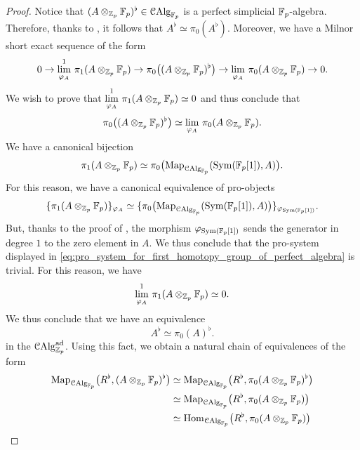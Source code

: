 \documentclass[10pt,a4paper]{amsart}
\numberwithin{equation}{subsection}
\theoremstyle{definition}
\def\lim{\mathrm{lim}}
\begin{document}
\begin{proof}
    Notice that $(A \otimes_{\mathbb Z_p} \mathbb F_p)^\flat \in \mathcal{C}\mathrm{Alg}_{\mathbb F_p}$ is a perfect simplicial $\mathbb F_p$-algebra. Therefore, thanks to \cite[Lemma 11.6]{bhatt2017projectivity}, it follows that $A^\flat \simeq \pi_0(A^\flat)$. Moreover,
    we have a Milnor short exact sequence of the form
        \[
            0 \to \underset{\varphi_{A}}{\overset{1}{\lim}} \ \pi_1(A \otimes_{\bZp} \bF_p) \to \pi_0 \big((A \otimes_{\bZp} \bF_p)^\flat \big) \to \underset{\varphi_A}{\lim} \ \pi_0(A \otimes_{\bZp} \bF_p) \to 0.
        \]
    We wish to prove that $\underset{\varphi_A}{\overset{1}{\lim}} \ \pi_1(A \otimes_{\bZp} \bF_p) \simeq 0 $ and thus conclude that
        \[
            \pi_0 \big( (A \otimes_{\bZp} \bF_p)^\flat \big) \simeq \underset{\varphi_A}{\lim} \ \pi_0(A \otimes_{\bZp} \bF_p) . 
        \]
    We have a canonical bijection
        \[
            \pi_1(A \otimes_{\mathbb Z_p} \mathbb F_p) \simeq \pi_0 \big( \mathrm{Map}_{\mathcal{C}\mathrm{Alg}_{\mathbb F_p}} (\mathrm{Sym}(\mathbb F_p[1]), A) \big).
        \]
    For this reason, we have a canonical equivalence of pro-objects
        \begin{equation} \label{eq:pro_system_for_first_homotopy_group_of_perfect_algebra}
            \{ \pi_1(A \otimes_{\mathbb Z_p} \mathbb F_p) \}_{\varphi_A} \simeq \{ \pi_0 \big(\mathrm{Map}_{\mathcal{C}\mathrm{Alg}_{\mathbb F_p}} (\mathrm{Sym}(\mathbb F_p[1]), A) \big) \}_{\varphi_{\mathrm{Sym}(\mathbb F_p[1])}}  .
        \end{equation}
    But, thanks to the proof of \cite[Lemma 11.6]{bhatt2017projectivity}, the morphism $\varphi_{\mathrm{Sym}(\mathbb F_p[1])}$ sends the generator in degree $1$ to the zero element in $A$. We thus conclude that the pro-system displayed in \eqref{eq:pro_system_for_first_homotopy_group_of_perfect_algebra} is trivial.
    For this reason, we have
        \[
            \underset{\varphi_A}{\overset{1}{\lim}} \ \pi_1(A \otimes_{\bZp} \bF_p)   \simeq 0.
        \]
    We thus conclude that we have an equivalence
        \[
            A^\flat \simeq \pi_0(A)^\flat.  
        \]
    in the \infcat $\mathcal C \mathrm{Alg}^{\mathrm{ad}}_{\mathbb Z_p}$. Using this fact, we obtain a natural chain of equivalences of the form
        \begin{align*}
            \Map_{\CAlg_{\bF_p}}\big( R^\flat, (A \otimes_{\bZp} \bF_p)^\flat \big) & \simeq \Map_{\CAlg_{\bF_p}} \big( R^\flat, \pi_0(A \otimes_{\bZp} \bF_p)^\flat \big) \\
                                                                                    & \simeq \Map_{\CAlg_{\bF_p}} \big( R^\flat, \pi_0(A \otimes_{\bZp} \bF_p)   \big) \\
                                                                                    & \simeq \Hom_{\CAlg_{\bF_p}} \big( R^{\flat}, \pi_0(A \otimes_{\bZp} \bF_p) \big) \\

\end{align*}
\end{proof}
\end{document}
